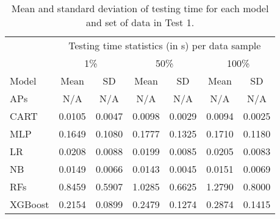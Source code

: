 \begin{table}[htbp!]
\caption{Mean and standard deviation of testing time for each model and set of data in Test 1.}
\label{tab:testing_exp1}
\begin{tabular}{lcccccc}
\toprule
& \multicolumn{6}{c}{Testing time statistics (in s) per data sample} \\
\cmidrule(lr){2-7}
& \multicolumn{2}{c}{1\%} & \multicolumn{2}{c}{50\%} & \multicolumn{2}{c}{100\%} \\
\cmidrule(lr){2-7}
Model & Mean & SD & Mean & SD & Mean & SD \\
\midrule
APs & N/A & N/A & N/A & N/A & N/A & N/A \\
CART & 0.0105 & 0.0047 & 0.0098 & 0.0029 & 0.0094 & 0.0025 \\
MLP & 0.1649 & 0.1080 & 0.1777 & 0.1325 & 0.1710 & 0.1180 \\
LR & 0.0208 & 0.0088 & 0.0199 & 0.0085 & 0.0205 & 0.0083 \\
NB & 0.0149 & 0.0066 & 0.0143 & 0.0045 & 0.0151 & 0.0069 \\
RFs & 0.8459 & 0.5907 & 1.0285 & 0.6625 & 1.2790 & 0.8000 \\
XGBoost & 0.2154 & 0.0899 & 0.2479 & 0.1274 & 0.2874 & 0.1415 \\
\bottomrule
\end{tabular}
\end{table}